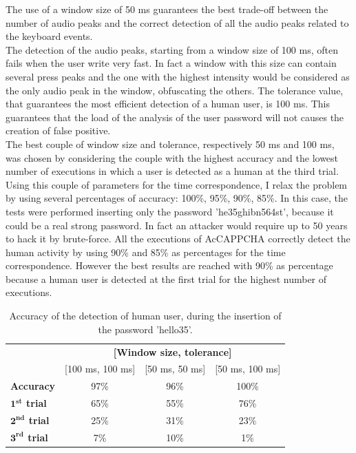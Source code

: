 The use of a window size of 50 ms guarantees the best trade-off between the number of audio peaks and the correct detection of all the audio peaks related to the keyboard events.\\
The detection of the audio peaks, starting from a window size of 100 ms, often fails when the user write very fast. In fact a window with this size can contain several press peaks and the one with the highest intensity would be considered as the only audio peak in the window, obfuscating the others. The tolerance value, that guarantees the most efficient detection of a human user, is 100 ms. This guarantees that the load of the analysis of the user password will not causes the creation of false positive.\\
The best couple of window size and tolerance, respectively 50 ms and 100 ms, was chosen by considering the couple with the highest accuracy and the lowest number of executions in which a user is detected as a human at the third trial. Using this couple of parameters for the time correspondence, I relax the problem by using several percentages of accuracy: 100\%, 95\%, 90\%, 85\%. In this case, the tests were performed inserting only the password 'he35ghibn564st', because it could be a real strong password. In fact an attacker would require up to 50 years to hack it by brute-force. All the executions of AcCAPPCHA correctly detect the human activity by using 90\% and 85\% as percentages for the time correspondence. However the best results are reached with 90\% as percentage because a human user is detected at the first trial for the highest number of executions.\\
\begin{table}[H]
\centering\footnotesize
\begin{tabular}{lccc}
\cline{2-4}
&\multicolumn{3}{c}{\textbf{[Window size, tolerance]}}\\
\cline{2-4}
&{[100 ms, 100 ms]}&{[50 ms, 50 ms]}&{[50 ms, 100 ms]}\\
\hline
{\textbf{Accuracy}}&{97\%}&{96\%}&{100\%}\\
\hline
{\textbf{$\mathbf{1^{st}}$ trial}}&{65\%}&{55\%}&{76\%}\\
\hline
{\textbf{$\mathbf{2^{nd}}$ trial}}&{25\%}&{31\%}&{23\%}\\
\hline
{\textbf{$\mathbf{3^{rd}}$ trial}}&{7\%}&{10\%}&{1\%}\\
\hline
\end{tabular}
\caption{\footnotesize{Accuracy of the detection of human user, during the insertion of the password 'hello35'.}}
\label{Results:hello35}
\end{table}
